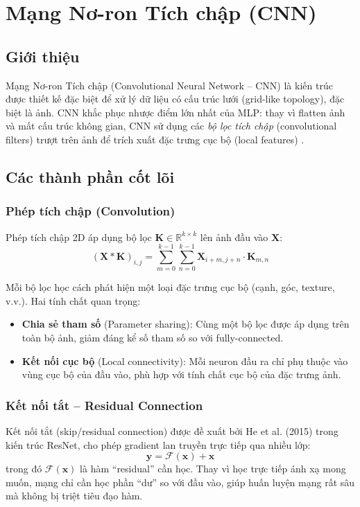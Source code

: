 \documentclass[a4paper]{article}
\theoremstyle{definition}
\begin{document}
\section{Mạng Nơ-ron Tích chập (CNN)}

\subsection{Giới thiệu}
Mạng Nơ-ron Tích chập (Convolutional Neural Network -- CNN) là kiến trúc được thiết kế đặc biệt để xử lý dữ liệu có cấu trúc lưới (grid-like topology), đặc biệt là ảnh. CNN khắc phục nhược điểm lớn nhất của MLP: thay vì flatten ảnh và mất cấu trúc không gian, CNN sử dụng các \textit{bộ lọc tích chập} (convolutional filters) trượt trên ảnh để trích xuất đặc trưng cục bộ (local features) \cite{lecun1998gradient}.

\subsection{Các thành phần cốt lõi}

\subsubsection{Phép tích chập (Convolution)}
Phép tích chập 2D áp dụng bộ lọc $\mathbf{K} \in \mathbb{R}^{k \times k}$ lên ảnh đầu vào $\mathbf{X}$:
\begin{equation}
	(\mathbf{X} * \mathbf{K})_{i,j} = \sum_{m=0}^{k-1} \sum_{n=0}^{k-1} \mathbf{X}_{i+m, j+n} \cdot \mathbf{K}_{m,n}
	\label{eq:conv2d}
\end{equation}

Mỗi bộ lọc học cách phát hiện một loại đặc trưng cục bộ (cạnh, góc, texture, v.v.). Hai tính chất quan trọng:
\begin{itemize}
	\item \textbf{Chia sẻ tham số} (Parameter sharing): Cùng một bộ lọc được áp dụng trên toàn bộ ảnh, giảm đáng kể số tham số so với fully-connected.
	\item \textbf{Kết nối cục bộ} (Local connectivity): Mỗi neuron đầu ra chỉ phụ thuộc vào vùng cục bộ của đầu vào, phù hợp với tính chất cục bộ của đặc trưng ảnh.
\end{itemize}

\subsubsection{Kết nối tắt -- Residual Connection}
Kết nối tắt (skip/residual connection) được đề xuất bởi He et al. (2015) \cite{he2016deep} trong kiến trúc ResNet, cho phép gradient lan truyền trực tiếp qua nhiều lớp:
\begin{equation}
	\mathbf{y} = \mathcal{F}(\mathbf{x}) + \mathbf{x}
	\label{eq:residual}
\end{equation}
trong đó $\mathcal{F}(\mathbf{x})$ là hàm ``residual'' cần học. Thay vì học trực tiếp ánh xạ mong muốn, mạng chỉ cần học phần ``dư'' so với đầu vào, giúp huấn luyện mạng rất sâu mà không bị triệt tiêu đạo hàm.
\end{document}
